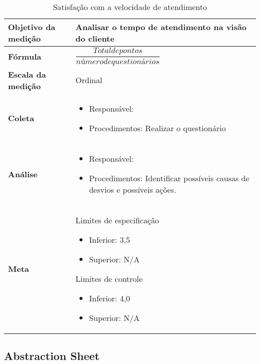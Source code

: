 \begin{table}[H]
\centering
\begin{tabular}{|p{4cm}|p{5cm}|}
\hline
	\textbf{Objetivo da medição} &
	Analisar o tempo de atendimento na visão do cliente
	\\ \hline
	\textbf{Fórmula} &
	$\dfrac{Total de pontos}{número de questionários}$
	\\ \hline
	\textbf{Escala da medição} &
	Ordinal
	\\ \hline
	\textbf{Coleta} &
	\begin{itemize}
		\item Responsável: \stefania
		\item Procedimentos: Realizar o questionário
	\end{itemize}
	\\ \hline
	\textbf{Análise} &
	\begin{itemize}
		\item Responsável: \fabio
		\item Procedimentos: Identificar possíveis causas de desvios e possíveis ações.
	\end{itemize}
	\\ \hline
  \textbf{Meta} &
	Limites de especificação
		\begin{itemize}
			\item Inferior: 3,5
			\item Superior: N/A
		\end{itemize}
	Limites de controle
		\begin{itemize}
			\item Inferior: 4,0
			\item Superior: N/A
		\end{itemize}
  \\ \hline
\end{tabular}
\caption{Satisfação com a velocidade de atendimento}
\label{tab:satisfacao_velocidade}
\end{table}

\subsection{Abstraction Sheet}

